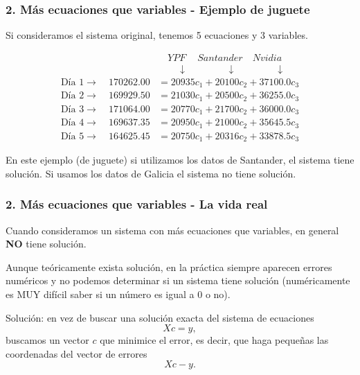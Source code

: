 \documentclass[aspectratio=169,12pt]{beamer}
\begin{document}

\begin{frame}
\frametitle{2. Más ecuaciones que variables - Ejemplo de juguete}

Si consideramos el sistema original, tenemos 5 ecuaciones y 3 variables.

\begin{align*}
& \quad YPF \quad \ Santander \quad Nvidia \\
& \quad \quad \downarrow \quad  \quad  \quad  \quad \downarrow  \quad  \quad \quad \quad \downarrow  \\
\text{D\'ia 1} \rightarrow \quad 170262.00	&= 20935	c_1 + 20100 c_2 + 37100.0 c_3 \\
\text{D\'ia 2} \rightarrow \quad 169929.50	&= 21030	c_1 + 20500 c_2 + 36255.0 c_3 \\
\text{D\'ia 3} \rightarrow \quad 171064.00	&= 20770	c_1 + 21700 c_2 + 36000.0 c_3 \\
\text{D\'ia 4} \rightarrow \quad 169637.35	&= 20950	c_1 + 21000 c_2 + 35645.5 c_3 \\
\text{D\'ia 5} \rightarrow \quad 164625.45	&= 20750	c_1 + 20316 c_2 + 33878.5 c_3
\end{align*}

En este ejemplo (de juguete) si utilizamos los datos de Santander, el sistema tiene solución.
Si usamos los datos de Galicia el sistema no tiene solución.

\end{frame}



\begin{frame}
\frametitle{2. Más ecuaciones que variables - La vida real}

Cuando consideramos un sistema con más ecuaciones que variables, en general \textbf{NO} tiene solución.

Aunque teóricamente exista solución, en la práctica siempre aparecen errores numéricos y no podemos determinar si un sistema tiene solución (numéricamente es MUY difícil saber si un número es igual a 0 o no).

Solución: en vez de buscar una solución exacta del sistema de ecuaciones
$$ X c = y,$$
buscamos un vector $c$ que minimice el error, es decir, que haga pequeñas las coordenadas del vector de errores
$$ X c - y.$$

\end{frame}
\end{document}
